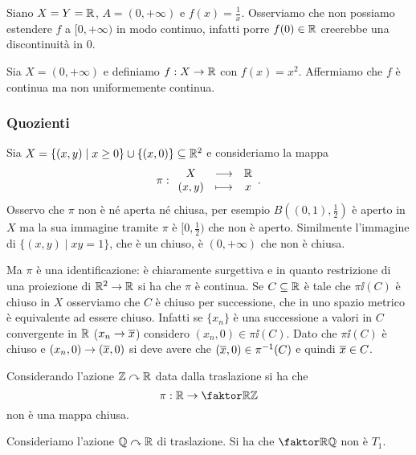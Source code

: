 \begin{multicols*}{2}
\begin{example}\label{ContinuaNonEstendibileAllaChiusura}
Siano $X=Y=\mathbb{R}$, $A=(0,+\infty)$ e $f(x)=\frac1x$. Osserviamo che non possiamo estendere $f$ a $[0,+\infty)$ in modo continuo, infatti porre $f(0)\in \mathbb{R}$ creerebbe una discontinuit\`a in $0$.
\end{example}

\begin{example}\label{ContinuaNonUniformementeContinua}
Sia $X=(0,+\infty)$ e definiamo $f:X\to\mathbb{R}$ con $f(x)=x^2$. Affermiamo che $f$ è continua ma non uniformemente continua.
\end{example}

\subsubsection{Quozienti}
\begin{example}\label{IdentificazioneNeApertaNeChiusa}
Sia $X=\{(x,y)\mid x\geq 0\}\cup \{(x,0)\}\subseteq \mathbb{R}^2$ e consideriamo la mappa \[\pi:\begin{array}{ccc} {X} & \longrightarrow & {\mathbb{R}}\\ {(x,y)} & \longmapsto & {x} \end{array}.\]
Osservo che $\pi$ non \`e n\'e aperta n\'e chiusa, per esempio $B((0,1),\frac12)$ \`e aperto in $X$ ma la sua immagine tramite $\pi$ \`e $[0,\frac12)$ che non \`e aperto. Similmente l'immagine di $\{(x,y)\mid xy=1\}$, che \`e un chiuso, \`e $(0,+\infty)$ che non \`e chiusa.

Ma $\pi$ \`e una identificazione: \`e chiaramente surgettiva e in quanto restrizione di una proiezione di $\mathbb{R}^2\to \mathbb{R}$ si ha che $\pi$ \`e continua. Se $C\subseteq \mathbb{R}$ \`e tale che $\pi\ii(C)$ \`e chiuso in $X$ osserviamo che $C$ \`e chiuso per successione, che in uno spazio metrico \`e equivalente ad essere chiuso. Infatti se $\{x_n\}$ \`e una successione a valori in $C$ convergente in $\R$ ($x_n\to \overline{x}$) considero $(x_n,0)\in \pi\ii(C)$. Dato che $\pi\ii(C)$ \`e chiuso e $(x_n,0)\to (\overline{x},0)$ si deve avere che $(\overline{x}, 0)\in \pi^{-1}(C)$ e quindi $\overline{x}\in C$.
\end{example}

\begin{example}\label{ProiezioneQuozienteAzioneNonChiusa}
Considerando l'azione $\mathbb{Z}\curvearrowright \mathbb{R}$ data dalla traslazione si ha che
\[\pi:\R\to \quot\R\Z\]
non \`e una mappa chiusa.
\end{example}

\begin{example}[$\R$ quoziente $\Q$]\label{RQuozienteQ}
Consideriamo l'azione $\mathbb{Q}\curvearrowright \mathbb{R}$ di traslazione. Si ha che $\quot \R\Q$ non \`e $T_1$.
\end{example}


\end{multicols*}
